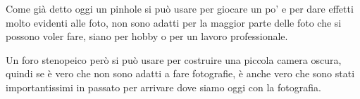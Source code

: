 Come già detto oggi un pinhole si può usare per giocare un po' e per dare effetti molto evidenti alle foto, non sono adatti per la maggior parte delle foto che si possono voler fare, siano per hobby o per un lavoro professionale.

Un foro stenopeico però si può usare per costruire una piccola camera oscura, quindi se è vero che non sono adatti a fare fotografie, è anche vero che sono stati importantissimi in passato per arrivare dove siamo oggi con la fotografia.